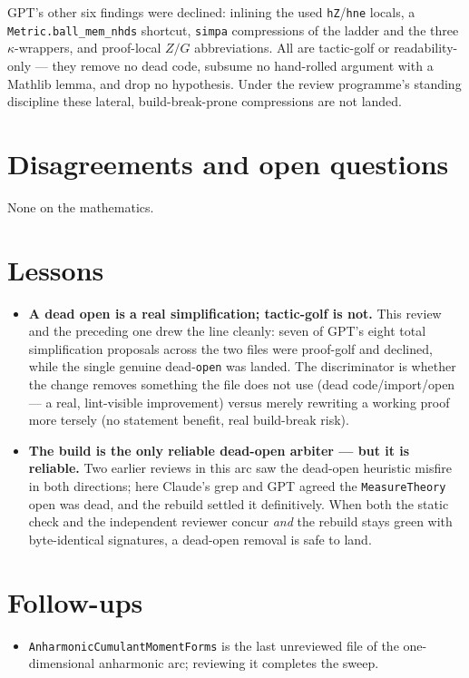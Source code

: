 \documentclass[11pt]{article}
\begin{document}
GPT's other six findings were declined: inlining the used \texttt{hZ}/\texttt{hne} locals, a
\texttt{Metric.ball\_mem\_nhds} shortcut, \texttt{simpa} compressions of the ladder and the three
$\kappa$-wrappers, and proof-local $Z/G$ abbreviations. All are tactic-golf or readability-only --- they
remove no dead code, subsume no hand-rolled argument with a Mathlib lemma, and drop no hypothesis. Under the
review programme's standing discipline these lateral, build-break-prone compressions are not landed.

\section{Disagreements and open questions}
None on the mathematics.

\section{Lessons}
\begin{itemize}[noitemsep]
  \item \textbf{A dead open is a real simplification; tactic-golf is not.} This review and the preceding one
    drew the line cleanly: seven of GPT's eight total simplification proposals across the two files were
    proof-golf and declined, while the single genuine dead-\texttt{open} was landed. The discriminator is
    whether the change removes something the file does not use (dead code/import/open --- a real, lint-visible
    improvement) versus merely rewriting a working proof more tersely (no statement benefit, real
    build-break risk).
  \item \textbf{The build is the only reliable dead-open arbiter --- but it is reliable.} Two earlier reviews
    in this arc saw the dead-open heuristic misfire in both directions; here Claude's grep and GPT agreed the
    \texttt{MeasureTheory} open was dead, and the rebuild settled it definitively. When both the static check
    and the independent reviewer concur \emph{and} the rebuild stays green with byte-identical signatures, a
    dead-open removal is safe to land.
\end{itemize}

\section{Follow-ups}
\begin{itemize}[noitemsep]
  \item \texttt{AnharmonicCumulantMomentForms} is the last unreviewed file of the one-dimensional anharmonic
    arc; reviewing it completes the sweep.
\end{itemize}
\end{document}
